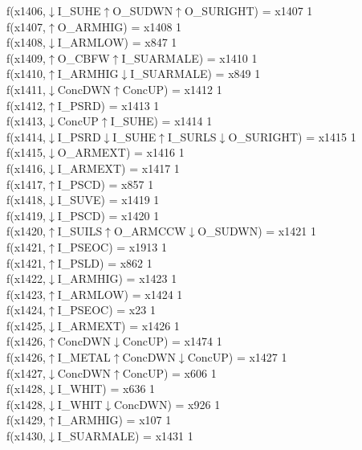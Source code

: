 f(x1406,$\downarrow$I\_SUHE$\uparrow$O\_SUDWN$\uparrow$O\_SURIGHT) = x1407 {1} \\
f(x1407,$\uparrow$O\_ARMHIG) = x1408 {1} \\
f(x1408,$\downarrow$I\_ARMLOW) = x847 {1} \\
f(x1409,$\uparrow$O\_CBFW$\uparrow$I\_SUARMALE) = x1410 {1} \\
f(x1410,$\uparrow$I\_ARMHIG$\downarrow$I\_SUARMALE) = x849 {1} \\
f(x1411,$\downarrow$ConcDWN$\uparrow$ConcUP) = x1412 {1} \\
f(x1412,$\uparrow$I\_PSRD) = x1413 {1} \\
f(x1413,$\downarrow$ConcUP$\uparrow$I\_SUHE) = x1414 {1} \\
f(x1414,$\downarrow$I\_PSRD$\downarrow$I\_SUHE$\uparrow$I\_SURLS$\downarrow$O\_SURIGHT) = x1415 {1} \\
f(x1415,$\downarrow$O\_ARMEXT) = x1416 {1} \\
f(x1416,$\downarrow$I\_ARMEXT) = x1417 {1} \\
f(x1417,$\uparrow$I\_PSCD) = x857 {1} \\
f(x1418,$\downarrow$I\_SUVE) = x1419 {1} \\
f(x1419,$\downarrow$I\_PSCD) = x1420 {1} \\
f(x1420,$\uparrow$I\_SUILS$\uparrow$O\_ARMCCW$\downarrow$O\_SUDWN) = x1421 {1} \\
f(x1421,$\uparrow$I\_PSEOC) = x1913 {1} \\
f(x1421,$\uparrow$I\_PSLD) = x862 {1} \\
f(x1422,$\downarrow$I\_ARMHIG) = x1423 {1} \\
f(x1423,$\uparrow$I\_ARMLOW) = x1424 {1} \\
f(x1424,$\uparrow$I\_PSEOC) = x23 {1} \\
f(x1425,$\downarrow$I\_ARMEXT) = x1426 {1} \\
f(x1426,$\uparrow$ConcDWN$\downarrow$ConcUP) = x1474 {1} \\
f(x1426,$\uparrow$I\_METAL$\uparrow$ConcDWN$\downarrow$ConcUP) = x1427 {1} \\
f(x1427,$\downarrow$ConcDWN$\uparrow$ConcUP) = x606 {1} \\
f(x1428,$\downarrow$I\_WHIT) = x636 {1} \\
f(x1428,$\downarrow$I\_WHIT$\downarrow$ConcDWN) = x926 {1} \\
f(x1429,$\uparrow$I\_ARMHIG) = x107 {1} \\
f(x1430,$\downarrow$I\_SUARMALE) = x1431 {1} \\
